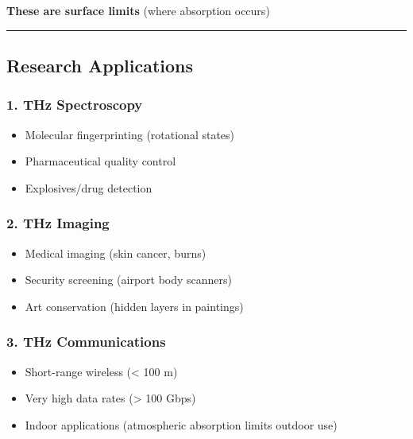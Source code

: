 \textbf{These are surface limits} (where absorption occurs)

\begin{center}\rule{0.5\linewidth}{0.5pt}\end{center}

\subsection{Research Applications}\label{research-applications}

\subsubsection{1. THz Spectroscopy}\label{thz-spectroscopy}

\begin{itemize}
\tightlist
\item
  Molecular fingerprinting (rotational states)
\item
  Pharmaceutical quality control
\item
  Explosives/drug detection
\end{itemize}

\subsubsection{2. THz Imaging}\label{thz-imaging}

\begin{itemize}
\tightlist
\item
  Medical imaging (skin cancer, burns)
\item
  Security screening (airport body scanners)
\item
  Art conservation (hidden layers in paintings)
\end{itemize}

\subsubsection{3. THz Communications}\label{thz-communications}

\begin{itemize}
\tightlist
\item
  Short-range wireless (\textless{} 100 m)
\item
  Very high data rates (\textgreater{} 100 Gbps)
\item
  Indoor applications (atmospheric absorption limits outdoor use)
\end{itemize}

